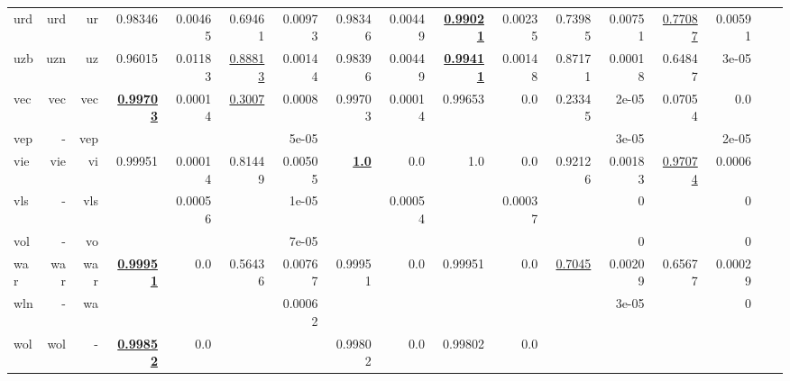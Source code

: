 \documentclass[11pt]{article}
\begin{document}
\begin{table*}[h]
{\begin{tabular}{lrrrrrrrrrrrrrrrr}
urd         & urd         & ur         & 0.98346         & 0.00465         & 0.69461         & 0.00973         & 0.98346         & 0.00449         & \textbf{\underline{0.99021}}         & 0.00235         & 0.73985         & 0.00751         & \underline{0.77087}         & 0.00591         \\
uzb         & uzn         & uz         & 0.96015         & 0.01183         & \underline{0.88813}         & 0.00144         & 0.98396         & 0.00449         & \textbf{\underline{0.99411}}         & 0.00148         & 0.87171         & 0.00018         & 0.64847         & 3e-05         \\
vec         & vec         & vec         & \textbf{\underline{0.99703}}         & 0.00014         & \underline{0.3007}         & 0.0008         & 0.99703         & 0.00014         & 0.99653         & 0.0         & 0.23345         & 2e-05         & 0.07054         & 0.0         \\
vep         & -         & vep         &          &          &          & 5e-05         &          &          &          &          &          & 3e-05         &          & 2e-05         \\
vie         & vie         & vi         & 0.99951         & 0.00014         & 0.81449         & 0.00505         & \textbf{\underline{1.0}}         & 0.0         & 1.0         & 0.0         & 0.92126         & 0.00183         & \underline{0.97074}         & 0.0006         \\
vls         & -         & vls         &          & 0.00056         &          & 1e-05         &          & 0.00054         &          & 0.00037         &          & 0         &          & 0         \\
vol         & -         & vo         &          &          &          & 7e-05         &          &          &          &          &          & 0         &          & 0         \\
war         & war         & war         & \textbf{\underline{0.99951}}         & 0.0         & 0.56436         & 0.00767         & 0.99951         & 0.0         & 0.99951         & 0.0         & \underline{0.7045}         & 0.00209         & 0.65677         & 0.00029         \\
wln         & -         & wa         &          &          &          & 0.00062         &          &          &          &          &          & 3e-05         &          & 0         \\
wol         & wol         & -         & \textbf{\underline{0.99852}}         & 0.0         &          &          & 0.99802         & 0.0         & 0.99802         & 0.0         &          &          &          &          \\

\end{tabular}}
\end{table*}
\end{document}
